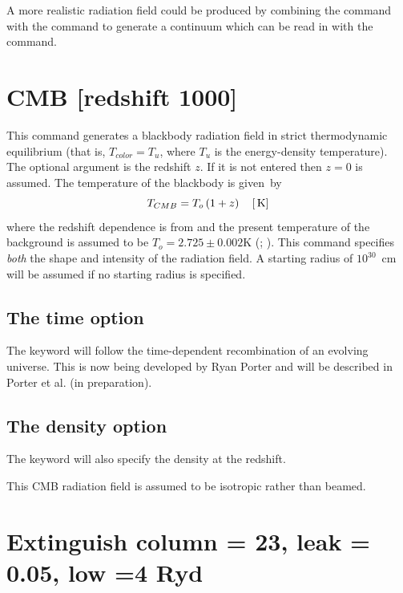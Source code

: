 A more realistic radiation field could be produced by combining the
 command with the
 command
to generate a continuum which can be read in with
the  command.

\section{CMB [redshift 1000]}

This command generates a blackbody radiation field in strict thermodynamic
equilibrium (that is, $T_{color} = T_u$, where $T_u$ is the energy-density
temperature).  The optional argument is the redshift $z$.
If it is not entered then $z = 0$ is assumed.
The temperature of the blackbody is given~by
\begin{equation}
T_{CMB}  = T_o \left( {1 + z} \right)\quad [{\rm\thinspace K}]
\end{equation}
where the redshift dependence is from \citet{Peebles1971} and the present
temperature of the background is assumed to be $T_o = 2.725\pm 0.002$K
(\citealp{Mather1999}; \citealp{Wilkinson1987}).
This command specifies \emph{both} the shape and
intensity of the radiation field.
A starting radius of $10^{30}$~cm will be
assumed if no starting radius is specified.

\begin{shaded}
\subsection{\experimental The time option}
The keyword  will follow the time-dependent
recombination of an evolving universe.
This is now being developed by Ryan Porter and will be described in
Porter et al. (in preparation).

\subsection{\experimental The density option}
The keyword  will also specify the density at
the redshift.
\end{shaded}

This CMB radiation field is assumed to be isotropic rather than beamed.

\section{Extinguish column = 23, leak = 0.05, low  =4 Ryd}

